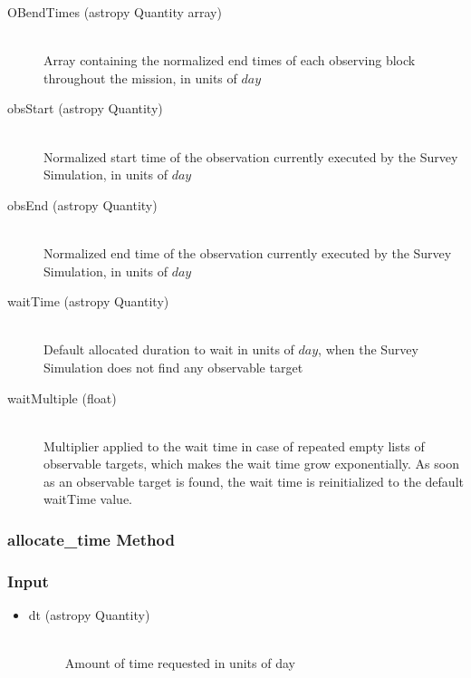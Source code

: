 \documentclass[cleanfoot]{asme2ej}
\begin{document}
\begin{itemize}
\begin{description}
    \item[OBendTimes (astropy Quantity array)] \hfill \\ Array containing the normalized end times of each observing block throughout the mission, in units of $day$
    \item[obsStart (astropy Quantity)] \hfill \\ Normalized start time of the observation currently executed by the Survey Simulation, in units of $day$
    \item[obsEnd (astropy Quantity)] \hfill \\ Normalized end time of the observation currently executed by the Survey Simulation, in units of $day$
    \item[waitTime (astropy Quantity)] \hfill \\ Default allocated duration to wait in units of $day$, when the Survey Simulation does not find any observable target
    \item[waitMultiple (float)] \hfill \\ Multiplier applied to the wait time in case of repeated empty lists of observable targets, which makes the wait time grow exponentially. As soon as an observable target is found, the wait time is reinitialized to the default waitTime value.


\end{description}
\end{itemize}

\subsubsection{allocate\_time Method} \label{sec:allocatetimetask}

\subsubsection*{Input}
\begin{itemize}
\item 
\begin{description}
    \item[dt (astropy Quantity)] \hfill \\ Amount of time requested in units of day
\end{description}
\end{itemize}
\end{document}
